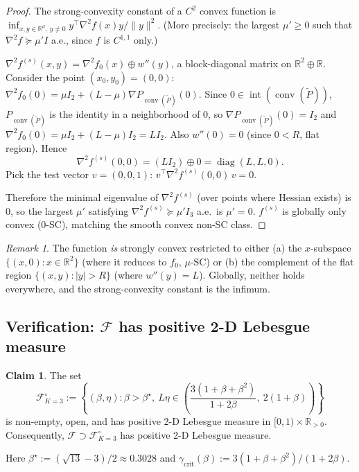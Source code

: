 \documentclass[11pt]{article}
\theoremstyle{definition}
\newtheorem{claim}[theorem]{Claim}
\theoremstyle{remark}
\newtheorem{remark}[theorem]{Remark}
\DeclareMathOperator{\conv}{conv}
\DeclareMathOperator{\diag}{diag}
\DeclareMathOperator{\interior}{int}
\begin{document}
\begin{proof}
The strong-convexity constant of a $C^2$ convex function is $\inf_{x,y \in \mathbb{R}^d,\ y \neq 0} y^\top \nabla^2 f(x) y / \|y\|^2$. (More precisely: the largest $\mu' \geq 0$ such that $\nabla^2 f \succeq \mu' I$ a.e., since $f$ is $C^{1,1}$ only.)

$\nabla^2 f^{(s)}(x, y) = \nabla^2 f_0(x) \oplus w''(y)$, a block-diagonal matrix on $\mathbb{R}^2 \oplus \mathbb{R}$. Consider the point $(x_0, y_0) = (0, 0)$: $\nabla^2 f_0(0) = \mu I_2 + (L-\mu)\nabla P_{\conv(\widetilde P)}(0)$. Since $0 \in \interior(\conv(\widetilde P))$, $P_{\conv(\widetilde P)}$ is the identity in a neighborhood of $0$, so $\nabla P_{\conv(\widetilde P)}(0) = I_2$ and $\nabla^2 f_0(0) = \mu I_2 + (L-\mu) I_2 = L I_2$. Also $w''(0) = 0$ (since $0 < R$, flat region). Hence
\[
  \nabla^2 f^{(s)}(0, 0) = (L I_2) \oplus 0 = \diag(L, L, 0).
\]
Pick the test vector $v = (0, 0, 1)$: $v^\top \nabla^2 f^{(s)}(0, 0)\, v = 0$.

Therefore the minimal eigenvalue of $\nabla^2 f^{(s)}$ (over points where Hessian exists) is $0$, so the largest $\mu'$ satisfying $\nabla^2 f^{(s)} \succeq \mu' I_3$ a.e.\ is $\mu' = 0$. $f^{(s)}$ is globally only convex ($0$-SC), matching the smooth convex non-SC class.
\end{proof}

\begin{remark}
The function \emph{is} strongly convex restricted to either (a) the $x$-subspace $\{(x, 0) : x \in \mathbb{R}^2\}$ (where it reduces to $f_0$, $\mu$-SC) or (b) the complement of the flat region $\{(x, y) : |y| > R\}$ (where $w''(y) = L$). Globally, neither holds everywhere, and the strong-convexity constant is the infimum.
\end{remark}

\subsection{Verification: \texorpdfstring{$\mathcal{F}$}{F} has positive 2-D Lebesgue measure}

\begin{claim}
\label{cl:positive-measure}
The set
\[
  \mathcal{F}_{K=3}^\circ := \left\{(\beta, \eta) : \beta > \beta^\star,\ L\eta \in \left(\frac{3(1 + \beta + \beta^2)}{1 + 2\beta},\ 2(1+\beta)\right)\right\}
\]
is non-empty, open, and has positive 2-D Lebesgue measure in $[0,1)\times\mathbb{R}_{>0}$. Consequently, $\mathcal{F} \supset \mathcal{F}_{K=3}^\circ$ has positive 2-D Lebesgue measure.

Here $\beta^\star := (\sqrt{13} - 3)/2 \approx 0.3028$ and $\gamma_{\mathrm{crit}}(\beta) := 3(1+\beta+\beta^2)/(1 + 2\beta)$.
\end{claim}
\end{document}
